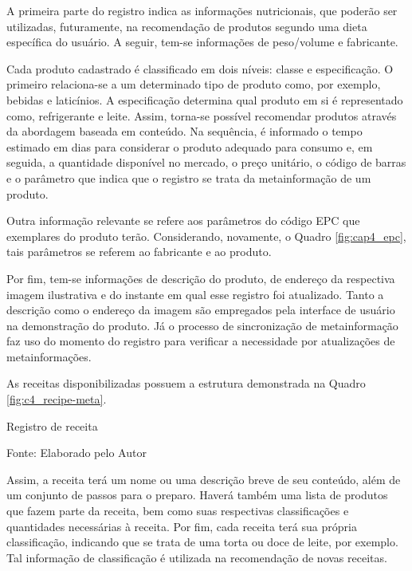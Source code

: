 A primeira parte do registro indica as informações nutricionais, que poderão ser utilizadas, futuramente, na recomendação de produtos segundo uma dieta específica do usuário. A seguir, tem-se informações de peso/volume e fabricante.

Cada produto cadastrado é classificado em dois níveis: classe e especificação. O primeiro relaciona-se a um determinado tipo de produto como, por exemplo, bebidas e laticínios. A especificação determina qual produto em si é representado como, refrigerante e leite. Assim, torna-se possível recomendar produtos através da abordagem baseada em conteúdo.
Na sequência, é informado o tempo estimado em dias para considerar o produto adequado para consumo e, em seguida, a quantidade disponível no mercado, o preço unitário, o código de barras e o parâmetro que indica que o registro se trata da metainformação de um produto.

Outra informação relevante se refere aos parâmetros do código EPC que exemplares do produto terão. Considerando, novamente, o Quadro \ref{fig:cap4_epc}, tais parâmetros se referem ao fabricante e ao produto.

Por fim, tem-se informações de descrição do produto, de endereço da respectiva imagem ilustrativa e do instante em qual esse registro foi atualizado. Tanto a descrição como o endereço da imagem são empregados pela interface de usuário na demonstração do produto. 
Já o processo de sincronização de metainformação faz uso do momento do registro para verificar a necessidade por atualizações de metainformações.

As receitas disponibilizadas possuem a estrutura demonstrada na Quadro \ref{fig:c4_recipe-meta}.
\begin{quadro}[htb]
    \caption{Registro de receita}
    \label{fig:c4_recipe-meta}
    
    \footnotesize{Fonte: Elaborado pelo Autor}
\end{quadro}
Assim, a receita terá um nome ou uma descrição breve de seu conteúdo, além de um conjunto de passos para o preparo. Haverá também uma lista de produtos que fazem parte da receita, bem como suas respectivas classificações e quantidades necessárias à receita. Por fim, cada receita terá sua própria classificação, indicando que se trata de uma torta ou doce de leite, por exemplo. Tal informação de classificação é utilizada na recomendação de novas receitas.

